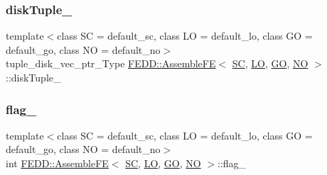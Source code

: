 \subsubsection{\texorpdfstring{disk\+Tuple\+\_\+}{diskTuple\_}}
{\footnotesize\ttfamily template$<$class SC  = default\+\_\+sc, class LO  = default\+\_\+lo, class GO  = default\+\_\+go, class NO  = default\+\_\+no$>$ \\
tuple\+\_\+disk\+\_\+vec\+\_\+ptr\+\_\+\+Type \hyperlink{classFEDD_1_1AssembleFE}{F\+E\+D\+D\+::\+Assemble\+FE}$<$ \hyperlink{fe__test__laplace_8cpp_a79c7e86a57edbb2a5a53242bcd04e41e}{SC}, \hyperlink{fe__test__laplace_8cpp_ad6a38c9f07d3fd633eefca5bccad8410}{LO}, \hyperlink{fe__test__laplace_8cpp_afa2946b509009b4f45eb04bd8c5b27d9}{GO}, \hyperlink{fe__test__laplace_8cpp_a5e24f37b28787429872b6ecb1d0417ce}{NO} $>$\+::disk\+Tuple\+\_\+\hspace{0.3cm}{\ttfamily [protected]}}

\mbox{\label{classFEDD_1_1AssembleFE_a222f91cd1b4296d37a520e510692ca8e}} 
\subsubsection{\texorpdfstring{flag\+\_\+}{flag\_}}
{\footnotesize\ttfamily template$<$class SC  = default\+\_\+sc, class LO  = default\+\_\+lo, class GO  = default\+\_\+go, class NO  = default\+\_\+no$>$ \\
int \hyperlink{classFEDD_1_1AssembleFE}{F\+E\+D\+D\+::\+Assemble\+FE}$<$ \hyperlink{fe__test__laplace_8cpp_a79c7e86a57edbb2a5a53242bcd04e41e}{SC}, \hyperlink{fe__test__laplace_8cpp_ad6a38c9f07d3fd633eefca5bccad8410}{LO}, \hyperlink{fe__test__laplace_8cpp_afa2946b509009b4f45eb04bd8c5b27d9}{GO}, \hyperlink{fe__test__laplace_8cpp_a5e24f37b28787429872b6ecb1d0417ce}{NO} $>$\+::flag\+\_\+\hspace{0.3cm}{\ttfamily [protected]}}

\mbox{\label{classFEDD_1_1AssembleFE_a12d587892b238ecf6b8fdb0b91c2b0be}} 
